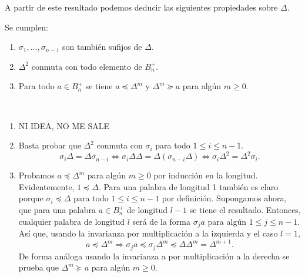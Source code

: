 \documentclass[TFG.tex]{subfiles}
\begin{document}
A partir de este resultado podemos deducir las siguientes propiedades sobre $\Delta$.

\begin{prop} Se cumplen:
\begin{enumerate}
\item $\sigma_1,\dots,\sigma_{n-1}$ son también sufijos de $\Delta$.
\item $\Delta^2$ conmuta con todo elemento de $B_n^+$.
\item Para todo $a\in B_n^+$ se tiene $a\preccurlyeq\Delta^m$ y $\Delta^m\succcurlyeq a$ para algún $m\geq 0$.
\end{enumerate}
\end{prop}
\begin{dem}\
\begin{enumerate}
\item NI IDEA, NO ME SALE
\item Basta probar que $\Delta^2$ conmuta con $\sigma_i$ para todo $1\leq i\leq n-1$. 
\[
\sigma_i\Delta=\Delta\sigma_{n-i}\Leftrightarrow \sigma_i\Delta\Delta=\Delta(\sigma_{n-i}\Delta)\Leftrightarrow \sigma_i\Delta^2=\Delta^2\sigma_i.
\]
\item Probamos $a\preccurlyeq\Delta^m$ para algún $m\geq 0$ por inducción en la longitud. Evidentemente, $1\preccurlyeq\Delta$. Para una palabra de longitud 1 también es claro porque $\sigma_i\preccurlyeq\Delta$ para todo $1\leq i\leq n-1$ por definición. Supongamos ahora, que para una palabra $a\in B_n^+$ de longitud $l-1$ se tiene el resultado. Entonces, cualquier palabra de longitud $l$ será de la forma $\sigma_j a$ para algún $1\leq j\leq n-1$. Así que, usando la invarianza por multiplicación a la izquierda y el caso $l=1$,
\[
a\preccurlyeq\Delta^m\Rightarrow \sigma_j a\preccurlyeq \sigma_j\Delta^m \preccurlyeq \Delta\Delta^m=\Delta^{m+1}.
\]
De forma análoga usando la invarianza a por multiplicación a la derecha se prueba que $\Delta^m\succcurlyeq a$ para algún $m\geq 0$.
\end{enumerate}
\QED
\end{dem}


\end{document}
